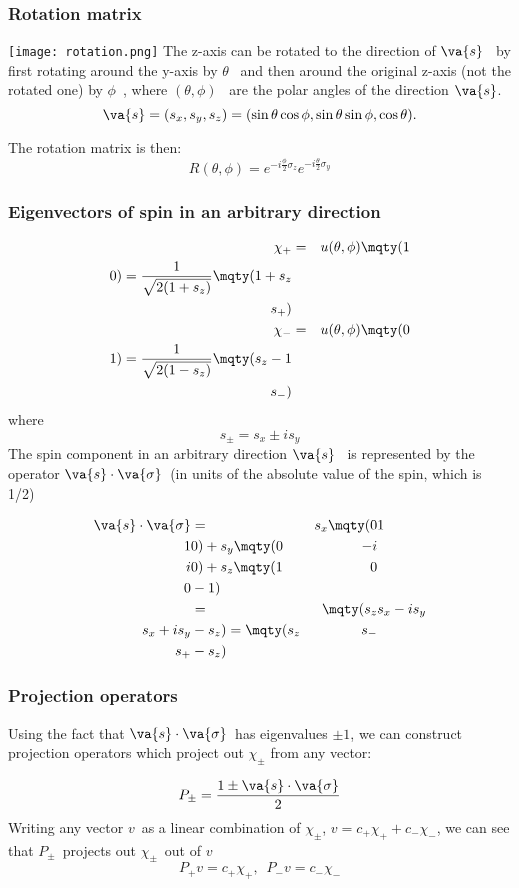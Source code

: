 \begin{frame}
\frametitle{Rotation matrix}

\texttt{[image: rotation.png]}
The z-axis can be rotated to the direction of $\va{s}$~  by first rotating around the y-axis by $\theta$~ and then around the original z-axis (not the rotated one) by $\phi$~, where $(\theta,\phi)$~ are the polar angles of the direction $\va{s}$. 
 \[
 \va{s} = (s_x, s_y, s_z) = (\sin\theta\cos\phi, \sin\theta\sin\phi, \cos\theta).
 \]

The rotation matrix is then: 
 \[
 R(\theta, \phi) = e^{-i\frac{\phi}{2}\sigma_z} e^{-i\frac{\theta}{2}\sigma_y}
 \]

 \end{frame}
 
 \begin{frame}
\frametitle{Eigenvectors of spin in an arbitrary direction}

 \begin{eqnarray*}
 \chi_{+} &= & u(\theta, \phi) \mqty(1\\0) = \frac{1}{\sqrt{2(1 + s_z)}}\mqty(1 + s_z\\ s_{+})\\
\chi_{-} &= & u(\theta, \phi) \mqty(0\\1) = \frac{1}{\sqrt{2(1 - s_z)}}\mqty( s_z - 1\\ s_{-})\\
\end{eqnarray*}
where
\[
s_{\pm} = s_x \pm i s_y
\]
The spin component in an arbitrary direction $\va{s}$~ is represented by the operator
$\va{s} \cdot \va{\sigma}$~(in units of the absolute value of the spin, which is 1/2)
 
 \begin{eqnarray*}
\va{s} \cdot \va{\sigma} &= &s_x \mqty(0 & 1\\ 1 & 0) + s_y \mqty(0 & -i\\ i & 0) + s_z \mqty(1 & 0\\ 0 & -1) \\
& = &  \mqty(s_z & s_x - i s_y\\ s_x + i s_y & -s_z) =
  \mqty(s_z & s_{-}\\ s_{+} &  -s_z) 
\end{eqnarray*}
 \end{frame}
 
 
  \begin{frame}
\frametitle{Projection operators}

Using the fact that $\va{s} \cdot \va{\sigma}$~has eigenvalues $\pm 1$, we can construct
projection operators which project out $\chi_{\pm}$ from any vector:

\[
P_{\pm} = \frac{1 \pm \va{s} \cdot \va{\sigma}}{2}
\]
Writing any vector $v$~as a linear combination of $\chi_{\pm}$, $v = c_{+}\chi_{+} + c_{-}\chi_{-}$, we can see that $P_{\pm}$~projects out $\chi_{\pm}$~out of $v$
\[
P_{+} v = c_{+} \chi_{+}, \,\,\, P_{-} v = c_{-} \chi_{-}
\]

 \end{frame}
